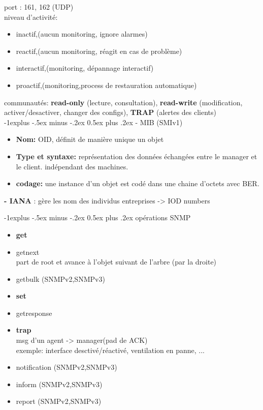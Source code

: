 \documentclass[12pt,landscape]{article}
\makeatletter
\renewcommand{\subsection}{\@startsection{subsection}{2}{0mm}%
                                {-1explus -.5ex minus -.2ex}%
                                {0.5ex plus .2ex}%
                                {\normalfont\fontsize{10}{12}\bfseries}}
\makeatother
\begin{document}
\begin{multicols}{2}
port : 161, 162 (UDP)\\
niveau d'activité:
\begin{itemize}
\item inactif,(aucun monitoring, ignore alarmes)
\item reactif,(aucun monitoring, réagit en cas de problème)
\item interactif,(monitoring, dépannage interactif)
\item proactif,(monitoring,process de restauration automatique)
\end{itemize}

communautés: \textbf{read-only} (lecture, consultation), \textbf{read-write} (modification, activer/desactiver, changer des configs), \textbf{TRAP} (alertes des clients)\\

\subsection{- MIB (SMIv1)}
\begin{itemize}
\item \textbf{Nom:} OID, définit de manière unique un objet
\item \textbf{Type et syntaxe:} représentation des données échangées entre le manager et le client. indépendant des machines. 
\item \textbf{codage:} une instance d'un objet est codé dans une chaine d'octets avec BER.
\end{itemize}

\textbf{- IANA} : gère les nom des individus entreprises -> IOD numbers

\subsection{opérations SNMP}
\begin{multicols}{2}
\begin{itemize}
\item \textbf{get}
\item getnext \\
part de root et avance à l'objet suivant de l'arbre (par la droite)
\item getbulk (SNMPv2,SNMPv3)
\item \textbf{set}
\item getresponse
\item \textbf{trap}\\
msg d'un agent -> manager(pad de ACK)\\
exemple: interface desctivé/réactivé, ventilation en panne, ...
\item notification (SNMPv2,SNMPv3)
\item inform (SNMPv2,SNMPv3)
\item report (SNMPv2,SNMPv3)
\end{itemize}
\end{multicols}


\end{multicols}
\end{document}
